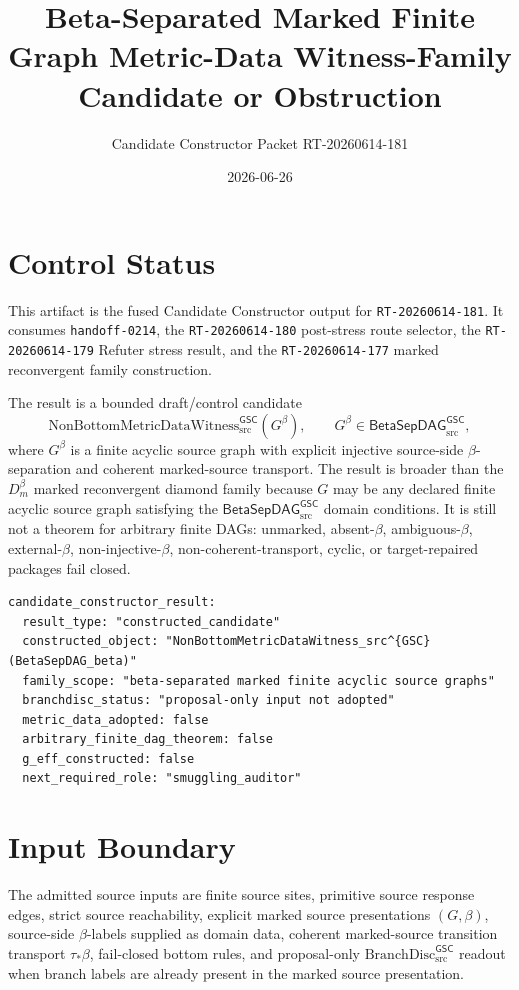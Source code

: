 \documentclass[11pt]{article}
\title{Beta-Separated Marked Finite Graph Metric-Data Witness-Family Candidate or Obstruction}
\author{Candidate Constructor Packet RT-20260614-181}
\date{2026-06-26}
\newcommand{\Witness}{\mathrm{NonBottomMetricDataWitness}_{\mathrm{src}}^{\mathsf{GSC}}}
\newcommand{\BranchDisc}{\mathrm{BranchDisc}_{\mathrm{src}}^{\mathsf{GSC}}}
\newcommand{\BetaGraph}{\mathsf{BetaSepDAG}_{\mathrm{src}}^{\mathsf{GSC}}}
\begin{document}
\maketitle

\section{Control Status}

This artifact is the fused Candidate Constructor output for
\texttt{RT-20260614-181}. It consumes \texttt{handoff-0214}, the
\texttt{RT-20260614-180} post-stress route selector, the
\texttt{RT-20260614-179} Refuter stress result, and the
\texttt{RT-20260614-177} marked reconvergent family construction.

The result is a bounded draft/control candidate
\[
  \Witness(G^\beta),\qquad G^\beta\in \BetaGraph,
\]
where \(G^\beta\) is a finite acyclic source graph with explicit injective
source-side \(\beta\)-separation and coherent marked-source transport. The
result is broader than the \(D_m^\beta\) marked reconvergent diamond family
because \(G\) may be any declared finite acyclic source graph satisfying the
\(\BetaGraph\) domain conditions. It is still not a theorem for arbitrary
finite DAGs: unmarked, absent-\(\beta\), ambiguous-\(\beta\), external-\(\beta\),
non-injective-\(\beta\), non-coherent-transport, cyclic, or target-repaired
packages fail closed.

\begin{verbatim}
candidate_constructor_result:
  result_type: "constructed_candidate"
  constructed_object: "NonBottomMetricDataWitness_src^{GSC}(BetaSepDAG_beta)"
  family_scope: "beta-separated marked finite acyclic source graphs"
  branchdisc_status: "proposal-only input not adopted"
  metric_data_adopted: false
  arbitrary_finite_dag_theorem: false
  g_eff_constructed: false
  next_required_role: "smuggling_auditor"
\end{verbatim}

\section{Input Boundary}

The admitted source inputs are finite source sites, primitive source response
edges, strict source reachability, explicit marked source presentations
\((G,\beta)\), source-side \(\beta\)-labels supplied as domain data, coherent
marked-source transition transport \(\tau_\ast\beta\), fail-closed bottom
rules, and proposal-only \(\BranchDisc\) readout when branch labels are already
present in the marked source presentation.
\end{document}
